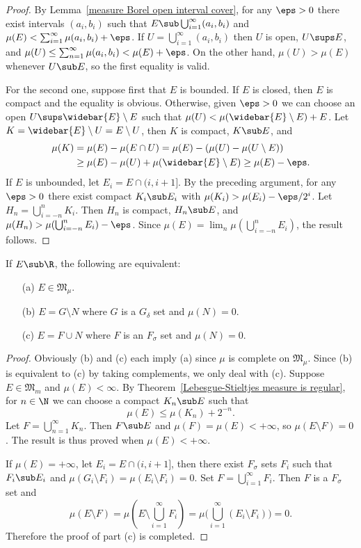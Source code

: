 \begin{proof}
By Lemma~\ref{measure Borel open interval cover}, for any $\eps>0$ there exist intervals $(a_i,b_i)$ such that $E\sub\bigcup_{i=1}^{\infty}(a_i,b_i)$ and $\mu(E)<\sum_{i=1}^{\infty}\mu(a_i,b_i)+\eps$. If $U=\bigcup_{i=1}^{\infty}(a_i,b_i)$ then $U$ is open, $U\sups E$, and $\mu(U)\leq\sum_{n=1}^{\infty}\mu(a_i,b_i)<\mu(E)+\eps$. On the other hand, $\mu(U)>\mu(E)$ whenever $U\sub E$, so the first equality is valid.\par
For the second one, suppose first that $E$ is bounded. If $E$ is closed, then $E$ is compact and the equality is obvious. Otherwise, given $\eps>0$ we can choose an open $U\sups\widebar{E}\setminus E$ such that $\mu(U)<\mu(\widebar{E}\setminus E)+E$. Let $K=\widebar{E}\setminus U=E\setminus U$, then $K$ is compact, $K\sub E$, and
\begin{align*}
\mu(K)&=\mu(E)-\mu(E\cap U)=\mu(E)-(\mu(U)-\mu(U\setminus E))\\
&\geq\mu(E)-\mu(U)+\mu(\widebar{E}\setminus E)\geq\mu(E)-\eps.
\end{align*}
If $E$ is unbounded, let $E_i=E\cap (i,i+1]$. By the preceding argument, for
any $\eps>0$ there exist compact $K_i\sub E_i$ with $\mu(K_i)>\mu(E_i)-\eps/2^i$. Let $H_n=\bigcup_{i=-n}^{n}K_i$. Then $H_n$ is compact, $H_n\sub E$, and $\mu(H_n)>\mu(\bigcup_{i=-n}^{n}E_i)-\eps$. Since $\mu(E)=\lim_{n}\mu(\bigcup_{i=-n}^{n}E_i)$, the result follows.
\end{proof}
\begin{theorem}\label{measure Lebesgue measurable iff differ measure zero}
If $E\sub\R$, the following are equivalent:
\begin{itemize}
\item[(a)] $E\in\mathfrak{M}_\mu$.
\item[(b)] $E=G\setminus N$ where $G$ is a $G_\delta$ set and $\mu(N)=0$.
\item[(c)] $E=F\cup N$ where $F$ is an $F_\sigma$ set and $\mu(N)=0$.
\end{itemize}
\end{theorem}
\begin{proof}
Obviously (b) and (c) each imply (a) since $\mu$ is complete on $\mathfrak{M}_\mu$. Since (b) is equivalent to (c) by taking complements, we only deal with (c). Suppose $E\in\mathfrak{M}_m$ and $\mu(E)<\infty$. By Theorem~\ref{Lebesgue-Stieltjes measure is regular}, for $n\in\N$ we can choose a compact $K_n\sub E$ such that
\[\mu(E)\leq\mu(K_n)+2^{-n}.\]
Let $F=\bigcup_{n=1}^{\infty}K_n$. Then $F\sub E$ and $\mu(F)=\mu(E)<+\infty$, so $\mu(E\setminus F)=0$. The result is thus proved when $\mu(E)<+\infty$.\par
If $\mu(E)=+\infty$, let $E_i=E\cap(i,i+1]$, then there exist $F_\sigma$ sets $F_i$ such that $F_i\sub E_i$ and $\mu(G_i\setminus F_i)=\mu(E_i\setminus F_i)=0$. Set $F=\bigcup_{i=1}^{\infty}F_i$. Then $F$ is a $F_\sigma$ set and 
\[\mu(E\setminus F)=\mu(E\setminus\bigcup_{i=1}^{\infty}F_i)=\mu\Big(\bigcup_{i=1}^{\infty}(E_i\setminus F_i)\Big)=0.\]
Therefore the proof of part (c) is completed. 
\end{proof}
